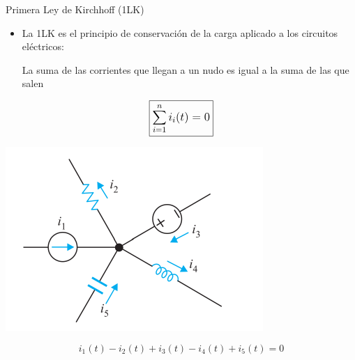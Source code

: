 \documentclass[aspectratio=169, xcolor={usenames,svgnames,dvipsnames}]{beamer}
\begin{document}
\begin{frame}{Primera Ley de Kirchhoff (1LK)}
    \begin{itemize}
        \item La \alert{1LK} es el principio de conservación de la carga aplicado a los circuitos eléctricos:
        \vspace{2mm}
        
        La suma de las corrientes que llegan a un nudo es igual a la suma de las que salen      
    \end{itemize}
    \vspace{2mm}
    \begin{equation*}
            \large{\boxed{\sum_{i=1}^n i_i(t)=0}}
        \end{equation*}
    \begin{center}
        \includegraphics[height=0.4\textheight]{../figs/LKC_FM.pdf}
    \end{center}
    \[
        i_1(t) - i_2(t) + i_3(t) - i_4(t) + i_5(t) = 0
    \]
\end{frame}

\end{document}

